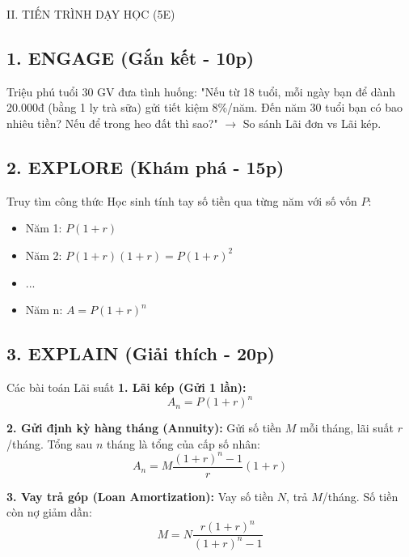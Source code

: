 \documentclass[12pt,a4paper]{article}
\begin{document}
\begin{sectionbox}{II. TIẾN TRÌNH DẠY HỌC (5E)}

\subsection*{1. ENGAGE (Gắn kết - 10p)}
\begin{activitybox}{Triệu phú tuổi 30}
GV đưa tình huống: "Nếu từ 18 tuổi, mỗi ngày bạn để dành 20.000đ (bằng 1 ly trà sữa) gửi tiết kiệm 8\%/năm. Đến năm 30 tuổi bạn có bao nhiêu tiền? Nếu để trong heo đất thì sao?"
$\to$ So sánh Lãi đơn vs Lãi kép.
\end{activitybox}

\subsection*{2. EXPLORE (Khám phá - 15p)}
\begin{activitybox}{Truy tìm công thức}
Học sinh tính tay số tiền qua từng năm với số vốn $P$:
\begin{itemize}
    \item Năm 1: $P(1+r)$
    \item Năm 2: $P(1+r)(1+r) = P(1+r)^2$
    \item ...
    \item Năm n: $A = P(1+r)^n$
\end{itemize}
\end{activitybox}

\subsection*{3. EXPLAIN (Giải thích - 20p)}
\begin{mathbox}{Các bài toán Lãi suất}
\textbf{1. Lãi kép (Gửi 1 lần):}
$$ A_n = P(1+r)^n $$

\textbf{2. Gửi định kỳ hàng tháng (Annuity):}
Gửi số tiền $M$ mỗi tháng, lãi suất $r$/tháng. Tổng sau $n$ tháng là tổng của cấp số nhân:
$$ A_n = M \frac{(1+r)^n - 1}{r} (1+r) $$

\textbf{3. Vay trả góp (Loan Amortization):}
Vay số tiền $N$, trả $M$/tháng. Số tiền còn nợ giảm dần:
$$ M = N \frac{r(1+r)^n}{(1+r)^n - 1} $$
\end{mathbox}


\end{sectionbox}
\end{document}
